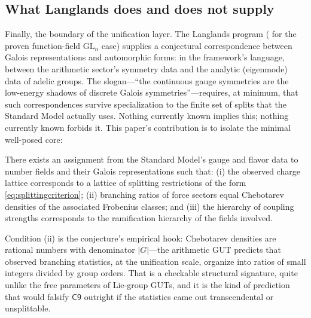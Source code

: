 \subsection{What Langlands does and does not supply}

Finally, the boundary of the unification layer. The Langlands program
(\cite{lafforgue2002} for the proven function-field $\mathrm{GL}_{n}$ case) supplies a
conjectural correspondence between Galois representations and automorphic forms: in the
framework's language, between the arithmetic sector's symmetry data and the analytic
(eigenmode) data of adelic groups. The slogan---``the continuous gauge symmetries
are the low-energy shadows of discrete Galois symmetries''---requires, at minimum, that
such correspondences survive specialization to the finite set of splits that the Standard
Model actually uses. Nothing currently known implies this; nothing currently known forbids
it. This paper's contribution is to isolate the minimal well-posed core:

\begin{conjecture}\label{conj:gut}
There exists an assignment from the Standard Model's gauge and flavor data to number fields
and their Galois representations such that: (i) the observed charge lattice corresponds to a
lattice of splitting restrictions of the form \eqref{eq:splittingcriterion}; (ii) branching
ratios of force sectors equal Chebotarev densities of the associated Frobenius classes; and
(iii) the hierarchy of coupling strengths corresponds to the ramification hierarchy of the
fields involved.
\end{conjecture}

Condition (ii) is the conjecture's empirical hook: Chebotarev densities are rational
numbers with denominator $|G|$---the arithmetic GUT predicts that observed branching
statistics, at the unification scale, organize into ratios of small integers divided by
group orders. That is a checkable structural signature, quite unlike the free parameters of
Lie-group GUTs, and it is the kind of prediction that would falsify $\mathsf{C9}$ outright
if the statistics came out transcendental or unsplittable.

